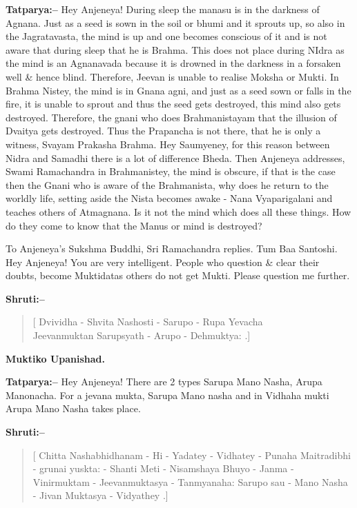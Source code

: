 \textbf{Tatparya:–} Hey Anjeneya! During sleep the manasu is in the darkness of Agnana. Just as a seed is sown in the soil or bhumi and it sprouts up, so also in the Jagratavasta, the mind is up and one becomes conscious of it and is not aware that during sleep that he is Brahma. This does not place during NIdra as the mind is an Agnanavada because it is drowned in the darkness in a forsaken well \& hence blind. Therefore, Jeevan is unable to realise Moksha or Mukti. In Brahma Nistey, the mind is in Gnana agni, and just as a seed sown or falls in the fire, it is unable to sprout and thus the seed gets destroyed, this mind also gets destroyed. Therefore, the gnani who does Brahmanistayam that the illusion of Dvaitya gets destroyed. Thus the Prapancha is not there, that he is only a witness, Svayam Prakasha Brahma. Hey Saumyeney, for this reason between Nidra and Samadhi there is a lot of difference Bheda. Then Anjeneya addresses, Swami Ramachandra in Brahmanistey, the mind is obscure, if that is the case then the Gnani who is aware of the Brahmanista, why does he return to the worldly life, setting aside the Nista becomes awake - Nana Vyaparigalani and teaches others of Atmagnana. Is it not the mind which does all these things. How do they come to know that the Manus or mind is destroyed?

To Anjeneya's Sukshma Buddhi, Sri Ramachandra replies. Tum Baa Santoshi. Hey Anjeneya! You are very intelligent. People who question \& clear their doubts, become Muktidatas others do not get Mukti. Please question me further.

\textbf{Shruti:–}

\begin{verse}
[ Dvividha - Shvita Nashosti - Sarupo - Rupa Yevacha \\ Jeevanmuktan Sarupsyath - Arupo - Dehmuktya: .]
\end{verse}

\begin{flushright}
\textbf{Muktiko Upanishad.}
\end{flushright}

\textbf{Tatparya:–} Hey Anjeneya! There are 2 types Sarupa Mano Nasha, Arupa Manonacha. For a jevana mukta, Sarupa Mano nasha and in Vidhaha mukti Arupa Mano Nasha takes place.

\textbf{Shruti:–}

\begin{verse}
[ Chitta Nashabhidhanam - Hi - Yadatey - Vidhatey - Punaha  Maitradibhi - grunai yuskta: - Shanti Meti - Nisamshaya  Bhuyo - Janma - Vinirmuktam - Jeevanmuktasya - Tanmyanaha: Sarupo sau - Mano Nasha - Jivan Muktasya - Vidyathey .]
\end{verse}


